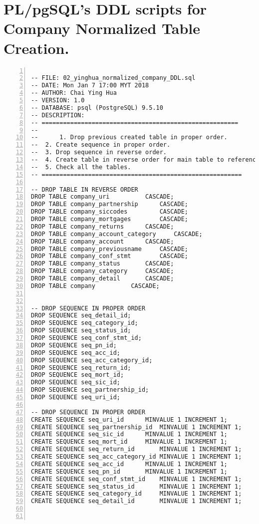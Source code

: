 \section{PL/pgSQL's DDL scripts for Company Normalized Table Creation.}
\lstset{basicstyle=\ttfamily\tiny}  
\begin{lstlisting}[breaklines, frame=single, numbers=left, caption={PL/pgSQL's DDL scripts for Company Normalized Table Creation.}, label=commandline-02]

-- FILE: 02_yinghua_normalized_company_DDL.sql  
-- DATE: Mon Jan 7 17:00 MYT 2018
-- AUTHOR: Chai Ying Hua 
-- VERSION: 1.0
-- DATABASE: psql (PostgreSQL) 9.5.10
-- DESCRIPTION:
-- =======================================================
--
--  	1. Drop previous created table in proper order. 
--	2. Create sequence in proper order. 
--	3. Drop sequence in reverse order. 
-- 	4. Create table in reverse order for main table to reference foreign key
--	5. Check all the tables. 
-- ========================================================

-- DROP TABLE IN REVERSE ORDER 
DROP TABLE company_uri 			CASCADE; 
DROP TABLE company_partnership 		CASCADE;
DROP TABLE company_siccodes 		CASCADE;
DROP TABLE company_mortgages 		CASCADE; 
DROP TABLE company_returns 		CASCADE; 
DROP TABLE company_account_category 	CASCADE; 
DROP TABLE company_account 		CASCADE;
DROP TABLE company_previousname 	CASCADE; 
DROP TABLE company_conf_stmt 		CASCADE;
DROP TABLE company_status		CASCADE;
DROP TABLE company_category		CASCADE;
DROP TABLE company_detail		CASCADE;
DROP TABLE company			CASCADE;


-- DROP SEQUENCE IN PROPER ORDER 
DROP SEQUENCE seq_detail_id;
DROP SEQUENCE seq_category_id;
DROP SEQUENCE seq_status_id;
DROP SEQUENCE seq_conf_stmt_id;
DROP SEQUENCE seq_pn_id;
DROP SEQUENCE seq_acc_id;
DROP SEQUENCE seq_acc_category_id;
DROP SEQUENCE seq_return_id;
DROP SEQUENCE seq_mort_id;
DROP SEQUENCE seq_sic_id;
DROP SEQUENCE seq_partnership_id;
DROP SEQUENCE seq_uri_id;

-- DROP SEQUENCE IN PROPER ORDER 
CREATE SEQUENCE seq_uri_id 		MINVALUE 1 INCREMENT 1; 
CREATE SEQUENCE seq_partnership_id	MINVALUE 1 INCREMENT 1; 
CREATE SEQUENCE seq_sic_id		MINVALUE 1 INCREMENT 1; 
CREATE SEQUENCE seq_mort_id		MINVALUE 1 INCREMENT 1; 
CREATE SEQUENCE seq_return_id		MINVALUE 1 INCREMENT 1; 
CREATE SEQUENCE seq_acc_category_id	MINVALUE 1 INCREMENT 1; 
CREATE SEQUENCE seq_acc_id		MINVALUE 1 INCREMENT 1; 
CREATE SEQUENCE seq_pn_id		MINVALUE 1 INCREMENT 1; 
CREATE SEQUENCE seq_conf_stmt_id	MINVALUE 1 INCREMENT 1; 
CREATE SEQUENCE seq_status_id	 	MINVALUE 1 INCREMENT 1; 
CREATE SEQUENCE seq_category_id		MINVALUE 1 INCREMENT 1; 
CREATE SEQUENCE seq_detail_id		MINVALUE 1 INCREMENT 1; 



\end{lstlisting}
